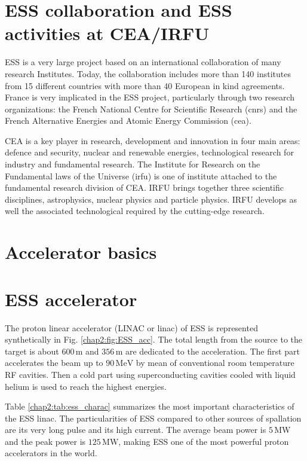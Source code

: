 \begin{refsection}
  \section{ESS collaboration and ESS activities at CEA/IRFU}

  ESS is a very large project based on an international collaboration of many research Institutes. Today, the collaboration includes more than 140 institutes from 15 different countries with more than 40 European in kind agreements. France is very implicated in the ESS project, particularly through two research organizations: the French National Centre for Scientific Research (\acrshort{cnrs}) and the French Alternative Energies and Atomic Energy Commission (\acrshort{cea}).

  CEA is a key player in research, development and innovation in four main areas: defence and security, nuclear and renewable energies, technological research for industry and fundamental research. The Institute for Research on the Fundamental laws of the Universe (\acrshort{irfu}) is one of institute attached to the fundamental research division of CEA. IRFU brings together three scientific disciplines, astrophysics, nuclear physics and particle physics. IRFU develops as well the associated technological required by the cutting-edge research.

  \section{Accelerator basics}

  \section{ESS accelerator}
  The proton linear accelerator (LINAC or linac) of ESS is represented synthetically in Fig. \ref{chap2:fig:ESS_acc}.
  The total length from the source to the target is about $600\,\mathrm{m}$ and $356\,\mathrm{m}$ are dedicated to the acceleration. The first part accelerates the beam up to $90\,\mathrm{MeV}$ by mean of conventional room temperature RF cavities. Then a cold part using superconducting cavities cooled with liquid helium is used to reach the highest energies.

  

  Table \ref{chap2:tab:ess_charac} summarizes the most important characteristics of the ESS linac. The particularities of ESS compared to other sources of spallation are its very long pulse and its high current. The average beam power is $5\,\mathrm{MW}$ and the peak power is $125\,\mathrm{MW}$, making ESS one of the most powerful proton accelerators in the world.


\end{refsection}

